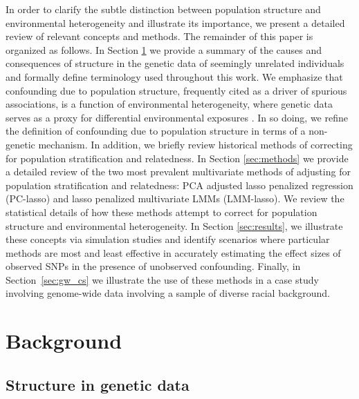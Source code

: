 In order to clarify the subtle distinction between population structure and environmental heterogeneity and illustrate its importance, we present a detailed review of relevant concepts and methods. The remainder of this paper is organized as follows. In Section \ref{sec:background} we provide a summary of the causes and consequences of structure in the genetic data of seemingly unrelated individuals and formally define terminology used throughout this work. We emphasize that confounding due to population structure, frequently cited as a driver of spurious associations, is a function of environmental heterogeneity, where genetic data serves as a proxy for differential environmental exposures \citep{Sillanpaeae2011, sul2018population, vilhjalmsson2012nature, barton2019population}. In so doing, we refine the definition of confounding due to population structure in terms of a non-genetic mechanism. In addition, we briefly review historical methods of correcting for population stratification and relatedness. In Section \ref{sec:methods} we provide a detailed review of the two most prevalent multivariate methods of adjusting for population stratification and relatedness: PCA adjusted lasso penalized regression (PC-lasso) and lasso penalized multivariate LMMs (LMM-lasso). We review the statistical details of how these methods attempt to correct for population structure and environmental heterogeneity. In Section \ref{sec:results}, we illustrate these concepts via simulation studies and identify scenarios where particular methods are most and least effective in accurately estimating the effect sizes of observed SNPs in the presence of unobserved confounding. Finally, in Section~\ref{sec:gw_cs} we illustrate the use of these methods in a case study involving genome-wide data involving a sample of diverse racial background.

\section{Background} \label{sec:background}

\subsection{Structure in genetic data}

